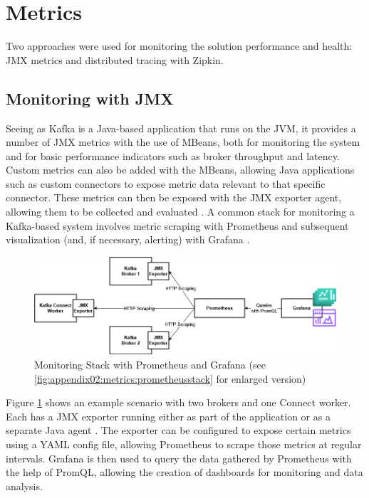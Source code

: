 \section{Metrics}
\label{ch04:pipelinedevelopment:metrics}
Two approaches were used for monitoring the solution performance and health: \ac{JMX} metrics and distributed tracing with Zipkin.

\subsection{Monitoring with JMX}
Seeing as Kafka is a Java-based application that runs on the \ac{JVM}, it provides a number of \ac{JMX} metrics with the use of \ac{MBeans}, both for monitoring the system and for basic performance indicators such as broker throughput and latency. Custom metrics can also be added with the \ac{MBeans}, allowing Java applications such as custom connectors to expose metric data relevant to that specific connector. These metrics can then be exposed with the \ac{JMX} exporter agent, allowing them to be collected and evaluated \cite{kafkamonitoringgrafana}. A common stack for monitoring a Kafka-based system involves metric scraping with Prometheus and subsequent visualization (and, if necessary, alerting) with Grafana \cite{applicationmonitoringkafka}.

\begin{figure}[htbp]
 \centering
 \includegraphics[width=1\textwidth]{chapters/images/kafka prometheus monitoring stack enlarged.drawio.png}
 \caption[Monitoring Stack with Prometheus and Grafana]{Monitoring Stack with Prometheus and Grafana (see \ref{fig:appendix02:metrics:prometheusstack} for enlarged version)}
 \label{fig:chapter04:metrics:prometheusstack}
\end{figure}

Figure \ref{fig:chapter04:metrics:prometheusstack} shows an example scenario with two brokers and one Connect worker. Each has a \ac{JMX} exporter running either as part of the application or as a separate Java agent \cite{kafkamonitoringgrafana}. The exporter can be configured to expose certain metrics using a YAML config file, allowing Prometheus to scrape those metrics at regular intervals. Grafana is then used to query the data gathered by Prometheus with the help of \ac{PromQL}, allowing the creation of dashboards for monitoring and data analysis.

